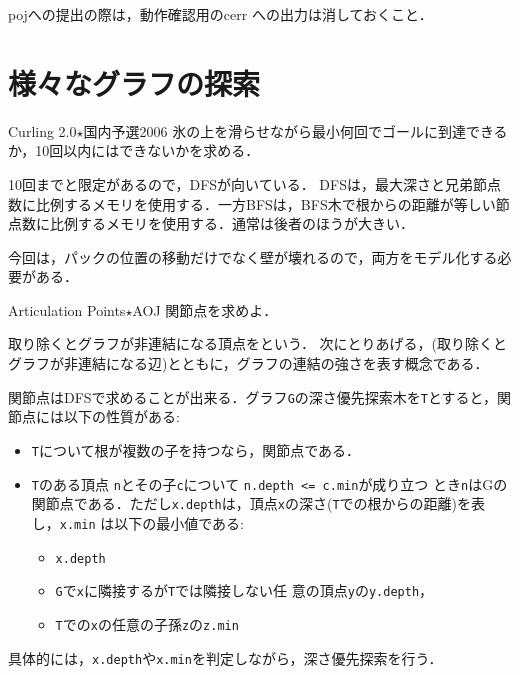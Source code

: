 pojへの提出の際は，動作確認用のcerr への出力は消しておくこと．

\section{様々なグラフの探索}

\begin{pbox}{Curling 2.0$\star$}{国内予選2006}
氷の上を滑らせながら最小何回でゴールに到達できるか，10回以内にはできないかを求める．

\end{pbox}

10回までと限定があるので，DFSが向いている．
DFSは，最大深さと兄弟節点数に比例するメモリを使用する．一方BFSは，BFS木で根からの距離が等しい節点数に比例するメモリを使用する．通常は後者のほうが大きい．

今回は，パックの位置の移動だけでなく壁が壊れるので，両方をモデル化する必要がある．

\begin{pbox}{Articulation Points$\star$}{AOJ}
関節点を求めよ．  

\end{pbox}

取り除くとグラフが非連結になる頂点をという．
次にとりあげる，(取り除くとグラフが非連結になる辺)とともに，グラフの連結の強さを表す概念である．

関節点はDFSで求めることが出来る．グラフ\texttt{G}の深さ優先探索木を\texttt{T}とすると，関節点には以下の性質がある:
\begin{itemize}
  \item \texttt{T}について根が複数の子を持つなら，関節点である．
  \item \texttt{T}のある頂点 \texttt{n}とその子\texttt{c}について \texttt{n.depth <= c.min}が成り立つ
    とき\texttt{n}はGの関節点である．ただし\texttt{x.depth}は，頂点\texttt{x}の深さ(\texttt{T}での根からの距離)を表し，\texttt{x.min}
    は以下の最小値である:
    \begin{itemize}
    \item \texttt{x.depth}
    \item \texttt{G}で\texttt{x}に隣接するが\texttt{T}では隣接しない任
      意の頂点\texttt{y}の\texttt{y.depth}，
    \item \texttt{T}での\texttt{x}の任意の子孫\texttt{z}の\texttt{z.min}
    \end{itemize}
\end{itemize}
具体的には，\texttt{x.depth}や\texttt{x.min}を判定しながら，深さ優先探索を行う．

